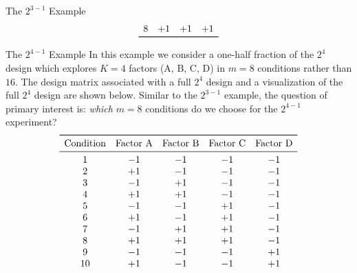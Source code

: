 \begin{itemize}
\begin{Example}{The $ 2^{3-1} $ Example}{}
\[\begin{array}{cccc}
                      8                & +1              & +1              & +1              \\
                      \bottomrule
                  \end{array} \]
          \end{Example}
          \begin{Example}{The $ 2^{4-1} $ Example}{}
              In this example we consider a one-half fraction of the $2^4$ design which
              explores $K = 4$ factors (A, B, C, D) in $m = 8$ conditions rather than $16$. The design matrix
              associated with a full $2^4$ design and a visualization of the full $2^4$ design are shown below. Similar
              to the $2^{3-1}$ example, the question of primary interest is: \emph{which} $m = 8$ conditions do we choose
              for the $2^{4-1}$ experiment?
              \[ \begin{array}{ccccc}
                      \toprule
                      \text{Condition} & \text{Factor A} & \text{Factor B} & \text{Factor C} & \text{Factor D} \\
                      \midrule
                      1                & -1              & -1              & -1              & -1              \\
                      2                & +1              & -1              & -1              & -1              \\
                      3                & -1              & +1              & -1              & -1              \\
                      4                & +1              & +1              & -1              & -1              \\
                      5                & -1              & -1              & +1              & -1              \\
                      6                & +1              & -1              & +1              & -1              \\
                      7                & -1              & +1              & +1              & -1              \\
                      8                & +1              & +1              & +1              & -1              \\
                      9                & -1              & -1              & -1              & +1              \\
                      10               & +1              & -1              & -1              & +1              \\

\end{array}\]
\end{Example}
\end{itemize}
